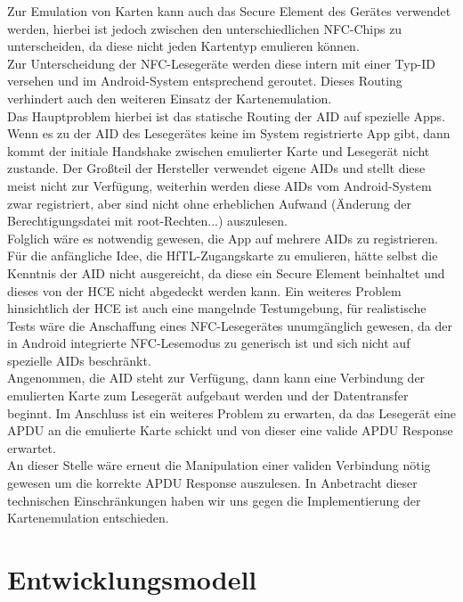 \documentclass[a4paper,ngerman,12pt]{scrreprt}
\newcommand{\+}{\discretionary{\mbox{\scriptsize$\hookleftarrow$}}{}{}}
\begin{document}
Zur Emulation von Karten kann auch das Secure Element des Gerätes verwendet werden, hierbei ist jedoch zwischen den unterschiedlichen N\+F\+C-\/\+Chips zu unterscheiden, da diese nicht jeden Kartentyp emulieren können.\\
\+Zur Unterscheidung der N\+F\+C-\/\+Lesegeräte werden diese intern mit einer Typ-\/\+ID versehen und im Android-\/\+System entsprechend geroutet. Dieses Routing verhindert auch den weiteren Einsatz der Kartenemulation.\\ Das Hauptproblem hierbei ist das statische Routing der \ac{AID} auf spezielle Apps. 
Wenn es zu der A\+ID des Lesegerätes keine im System registrierte App gibt, dann kommt der initiale Handshake zwischen emulierter Karte und Lesegerät nicht zustande. 
Der Großteil der Hersteller verwendet eigene A\+I\+Ds und stellt diese meist nicht zur Verfügung, weiterhin werden diese A\+I\+Ds vom Android-\/\+System zwar registriert, aber sind nicht ohne erheblichen Aufwand (Änderung der Berechtigungsdatei mit root-\/\+Rechten...) auszulesen. \\
Folglich wäre es notwendig gewesen, die App auf mehrere A\+I\+Ds zu registrieren. Für die anfängliche Idee, die Hf\+T\+L-\/\+Zugangskarte zu emulieren, hätte selbst die Kenntnis der A\+ID nicht ausgereicht, da diese ein Secure Element beinhaltet und dieses von der \ac{HCE} nicht abgedeckt werden kann. \newpage
Ein weiteres Problem hinsichtlich der \ac{HCE} ist auch eine mangelnde Testumgebung, für realistische Tests wäre die Anschaffung eines N\+F\+C-\/\+Lesegerätes unumgänglich gewesen, da der in Android integrierte N\+F\+C-\/\+Lesemodus zu generisch ist und sich nicht auf spezielle A\+I\+Ds beschränkt. \\
Angenommen, die A\+ID steht zur Verfügung, dann kann eine Verbindung der emulierten Karte zum Lesegerät aufgebaut werden und der Datentransfer beginnt. 
Im Anschluss ist ein weiteres Problem zu erwarten, da das Lesegerät eine \ac{APDU} an die emulierte Karte schickt und von dieser eine valide APDU Response erwartet. \\
An dieser Stelle wäre erneut die Manipulation einer validen Verbindung nötig gewesen um die korrekte APDU Response auszulesen. In Anbetracht dieser technischen Einschränkungen haben wir uns gegen die Implementierung der Kartenemulation entschieden.

\section{Entwicklungsmodell}
\end{document}
